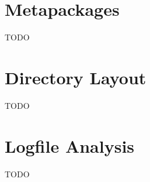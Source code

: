 \section{Metapackages}
\label{sec:metapacks}

TODO

\section{Directory Layout}

TODO


\section{Logfile Analysis}

TODO





